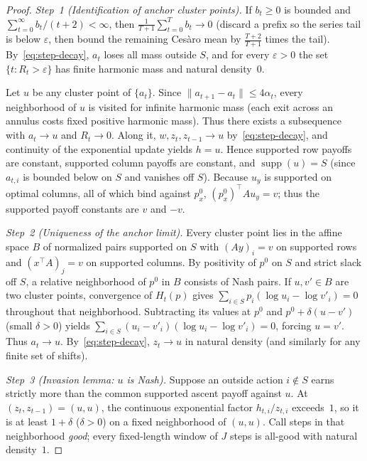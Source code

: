 \documentclass[11pt]{article}
\theoremstyle{plain}
\theoremstyle{definition}
\theoremstyle{remark}
\DeclareMathOperator{\supp}{supp}
\begin{document}
\begin{proof}
\emph{Step~1 (Identification of anchor cluster points).}
If $b_t \ge 0$ is bounded and $\sum_{t=0}^\infty b_t/(t+2) < \infty$, then $\frac{1}{T+1}\sum_{t=0}^T b_t \to 0$ (discard a prefix so the series tail is below $\varepsilon$, then bound the remaining Ces\`aro mean by $\frac{T+2}{T+1}$ times the tail). By~\eqref{eq:step-decay}, $a_t$ loses all mass outside $S$, and for every $\varepsilon > 0$ the set $\{t : R_t > \varepsilon\}$ has finite harmonic mass and natural density~$0$.

Let $u$ be any cluster point of $\{a_t\}$. Since $\|a_{t+1} - a_t\| \le 4\alpha_t$, every neighborhood of $u$ is visited for infinite harmonic mass (each exit across an annulus costs fixed positive harmonic mass). Thus there exists a subsequence with $a_t \to u$ and $R_t \to 0$. Along it, $w, z_t, z_{t-1} \to u$ by~\eqref{eq:step-decay}, and continuity of the exponential update yields $h = u$. Hence supported row payoffs are constant, supported column payoffs are constant, and $\supp(u) = S$ (since $a_{t,i}$ is bounded below on $S$ and vanishes off $S$). Because $u_y$ is supported on optimal columns, all of which bind against $p_x^0$, $(p_x^0)^\top A u_y = v$; thus the supported payoff constants are $v$ and $-v$.

\emph{Step~2 (Uniqueness of the anchor limit).}
Every cluster point lies in the affine space $B$ of normalized pairs supported on $S$ with $(Ay)_i = v$ on supported rows and $(x^\top A)_j = v$ on supported columns. By positivity of $p^0$ on $S$ and strict slack off $S$, a relative neighborhood of $p^0$ in $B$ consists of Nash pairs. If $u, v' \in B$ are two cluster points, convergence of $H_t(p)$ gives $\sum_{i \in S} p_i(\log u_i - \log v'_i) = 0$ throughout that neighborhood. Subtracting its values at $p^0$ and $p^0 + \delta(u - v')$ (small $\delta > 0$) yields $\sum_{i \in S}(u_i - v'_i)(\log u_i - \log v'_i) = 0$, forcing $u = v'$. Thus $a_t \to u$. By~\eqref{eq:step-decay}, $z_t \to u$ in natural density (and similarly for any finite set of shifts).

\emph{Step~3 (Invasion lemma: $u$ is Nash).}
Suppose an outside action $i \notin S$ earns strictly more than the common supported ascent payoff against $u$. At $(z_t, z_{t-1}) = (u, u)$, the continuous exponential factor $h_{t,i}/z_{t,i}$ exceeds~$1$, so it is at least $1 + \delta$ ($\delta > 0$) on a fixed neighborhood of $(u, u)$. Call steps in that neighborhood \emph{good}; every fixed-length window of $J$ steps is all-good with natural density~$1$.


\end{proof}
\end{document}
